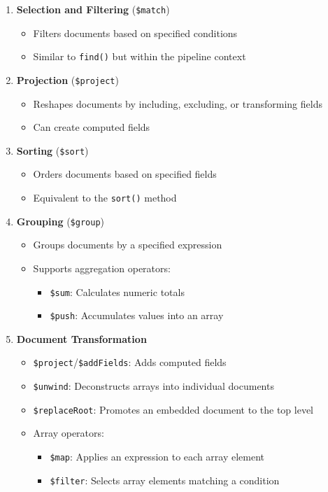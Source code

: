 \documentclass{article}
\begin{document}
  \begin{enumerate}
    \item \textbf{Selection and Filtering} (\texttt{\$match})
    \begin{itemize}
        \item Filters documents based on specified conditions
        \item Similar to \texttt{find()} but within the pipeline context
    \end{itemize}

    \item \textbf{Projection} (\texttt{\$project})
    \begin{itemize}
        \item Reshapes documents by including, excluding, or transforming fields
        \item Can create computed fields
    \end{itemize}

    \item \textbf{Sorting} (\texttt{\$sort})
    \begin{itemize}
        \item Orders documents based on specified fields
        \item Equivalent to the \texttt{sort()} method
    \end{itemize}

    \item \textbf{Grouping} (\texttt{\$group})
    \begin{itemize}
        \item Groups documents by a specified expression
        \item Supports aggregation operators:
            \begin{itemize}
                \item \texttt{\$sum}: Calculates numeric totals
                \item \texttt{\$push}: Accumulates values into an array
            \end{itemize}
    \end{itemize}

    \item \textbf{Document Transformation}
    \begin{itemize}
        \item \texttt{\$project}/\texttt{\$addFields}: Adds computed fields
        \item \texttt{\$unwind}: Deconstructs arrays into individual documents
        \item \texttt{\$replaceRoot}: Promotes an embedded document to the top level
        \item Array operators:
            \begin{itemize}
                \item \texttt{\$map}: Applies an expression to each array element
                \item \texttt{\$filter}: Selects array elements matching a condition
            \end{itemize}
    \end{itemize}


\end{enumerate}
\end{document}
